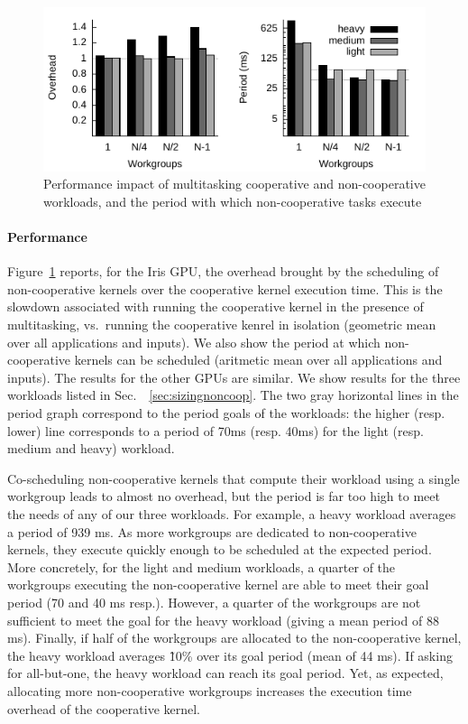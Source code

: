 \documentclass[numbers,nocopyrightspace,10pt]{sigplanconf}
\newcommand{\myfiglong}{Figure~}
\newcommand{\mysec}{Sec.~}
\begin{document}
\begin{figure}
\includegraphics[width=\columnwidth]{heavy.pdf} 
\caption{Performance impact of multitasking cooperative and non-cooperative workloads, and the period with which non-cooperative tasks execute}\label{fig:performance}
\end{figure}


\paragraph{Performance} 
\myfiglong\ref{fig:performance} reports, for the Iris GPU, the overhead brought by the scheduling of
non-cooperative kernels over the cooperative kernel execution time.  This is the slowdown associated with running the cooperative kernel in the presence of multitasking, vs.\ running the cooperative kenrel in isolation (geometric mean over all applications and inputs).  We also show the period at which non-cooperative kernels can be scheduled (aritmetic mean over all applications
and inputs).
The results for the other GPUs are similar.
 We show
results for the three workloads listed in
\mysec~\ref{sec:sizingnoncoop}. The two gray horizontal lines in the
period graph correspond to the period goals of the workloads: the higher
(resp. lower) line corresponds to a period of 70ms (resp. 40ms) for the
light (resp. medium and heavy) workload.

Co-scheduling non-cooperative kernels that compute their workload using a single workgroup leads to almost no overhead, but the period is far too high to meet the needs
of any of our three workloads. For example, a heavy workload averages a
period of 939 ms. As more workgroups are dedicated to non-cooperative
kernels, they execute quickly enough to be scheduled at the expected
period. More concretely, for the light and medium workloads, a quarter
of the workgroups executing the non-cooperative kernel are able to meet
their goal period (70 and 40 ms resp.). However, a quarter of the
workgroups are not sufficient to meet the goal for the heavy workload
(giving a mean period of 88 ms). Finally, if half of the workgroups are
allocated to the non-cooperative kernel, the heavy workload averages \~10\% over its goal period (mean of 44 ms). If asking for all-but-one, the heavy workload can reach its goal period.
%
Yet, as expected, allocating more non-cooperative workgroups increases
the execution time overhead of the cooperative kernel.
\end{document}
